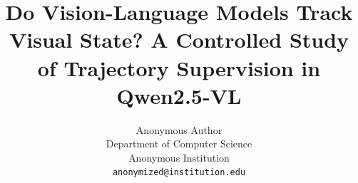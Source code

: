 \documentclass[10pt,twocolumn,letterpaper]{article}
\title{Do Vision-Language Models Track Visual State? A Controlled Study of Trajectory Supervision in Qwen2.5-VL}
\author{Anonymous Author\\
Department of Computer Science\\
Anonymous Institution\\
{\tt\small anonymized@institution.edu}
}
\begin{document}
\maketitle










{\small


}
\end{document}
